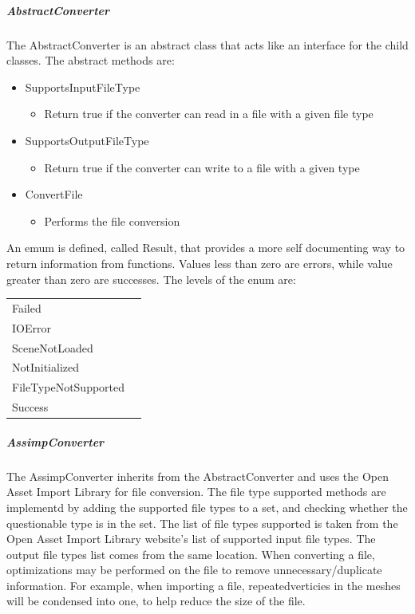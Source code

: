     \subparagraph{AbstractConverter}
    \hfill \break
    The AbstractConverter is an abstract class that acts like an interface for the child classes.  The abstract methods are:
    \begin{itemize}
        \item SupportsInputFileType
        \begin{itemize}
            \item Return true if the converter can read in a file with a given file type
        \end{itemize}

        \item SupportsOutputFileType
        \begin{itemize}
            \item Return true if the converter can write to a file with a given type
        \end{itemize}

        \item ConvertFile
        \begin{itemize}
            \item Performs the file conversion
        \end{itemize}
    \end{itemize}

    An emum is defined, called Result, that provides a more self documenting way to return information from functions.  Values less than zero are errors, while
    value greater than zero are successes.  The levels of the enum are:
    
    \begin{tabular}{l l}
        \centering
        Failed &\\
        IOError &\\
        SceneNotLoaded &\\
        NotInitialized &\\
        FileTypeNotSupported &\\
        Success &
    \end{tabular}

    \subparagraph{AssimpConverter}
    \hfill \break
    The AssimpConverter inherits from the AbstractConverter and uses the Open Asset Import Library for file conversion.  
    The file type supported methods are implementd by adding the supported file types to a set, and checking whether the questionable type is in the set.
    The list of file types supported is taken from the Open Asset Import Library website's list of supported input file types.  
    The output file types list comes from the same location.
    When converting a file, optimizations may be performed on the file to remove unnecessary/duplicate information.  For example, when importing a file, 
    repeatedverticies in the meshes will be condensed into one, to help reduce the size of the file.


